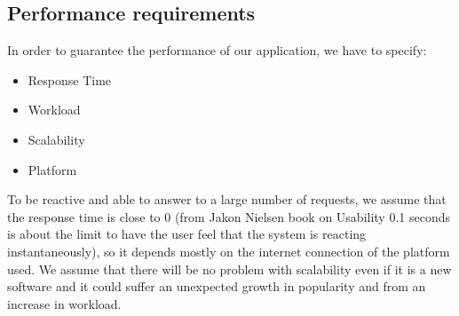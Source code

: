 \documentclass[12pt,titlepage]{article}
\begin{document}
\begin{figure}
\centering
{}

\end{figure}


\pagebreak

\subsection{Performance requirements}\label{sec:mod1}
In order to guarantee the performance of our application, we have to specify:
\begin{itemize}
\item Response Time 
\item Workload
\item Scalability
\item Platform
\end{itemize}
To be reactive and able to answer to a large number of requests, we assume that the response time is close to 0 (from Jakon Nielsen book on Usability 0.1 seconds is about the limit to have the user feel that the system is reacting instantaneously), so it depends mostly on the internet connection of the platform used. 
We assume that there will be no problem with scalability even if it is a new software and it could suffer an unexpected growth in popularity and from an increase in workload.
\end{document}
